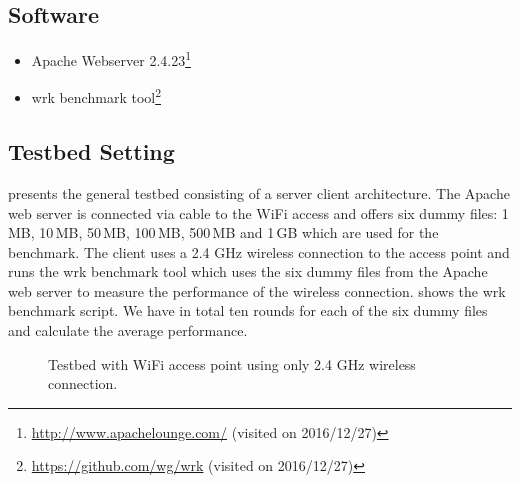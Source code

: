 \subsection{Software}
\begin{itemize}
	\item Apache Webserver 
	2.4.23\footnote{\url{http://www.apachelounge.com/} (visited 
	on 2016/12/27)}
	\item wrk benchmark 
	tool\footnote{\url{https://github.com/wg/wrk} (visited on 
	2016/12/27)}
\end{itemize}

\subsection{Testbed Setting}
 presents the general testbed 
consisting of a server client architecture. The Apache web 
server is connected via cable to the WiFi access and offers six 
dummy files: 1\,MB, 10\,MB, 50\,MB, 100\,MB, 500\,MB and 1\,GB 
which are used for the benchmark. The client uses a 2.4 GHz 
wireless connection to the access point and runs the wrk 
benchmark tool which uses the six dummy files from the Apache 
web server to measure the performance of the wireless 
connection.  shows the wrk 
benchmark script. We have in total ten rounds for each of the 
six dummy files and calculate the average performance.

\begin{figure}
	\centering
	\caption{Testbed with WiFi access point using only 2.4 GHz 
		wireless connection.}
	\label{fig:TestbedArchitecture}
\end{figure}


